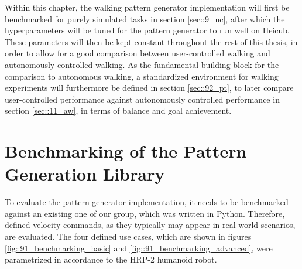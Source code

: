 \FloatBarrier
\label{sec::9_uc}
Within this chapter, the walking pattern generator implementation will first be benchmarked for purely simulated tasks in section \ref{sec::9_uc}, after which the hyperparameters will be tuned for the pattern generator to run well on Heicub. These parameters will then be kept constant throughout the rest of this thesis, in order to allow for a good comparison between user-controlled walking and autonomously controlled walking. As the fundamental building block for the comparison to autonomous walking, a standardized environment for walking experiments will furthermore be defined in section \ref{sec::92_pt}, to later compare user-controlled performance against autonomously controlled performance in section \ref{sec::11_aw}, in terms of balance and goal achievement.
\section{Benchmarking of the Pattern Generation Library}
\label{sec::91_bm}
To evaluate the pattern generator implementation, it needs to be benchmarked against an existing one of our group, which was written in Python. Therefore, defined velocity commands, as they typically may appear in real-world scenarios, are evaluated. The four defined use cases, which are shown in figures \ref{fig::91_benchmarking_basic} and \ref{fig::91_benchmarking_advanced}, were parametrized in accordance to the HRP-2 humanoid robot.
